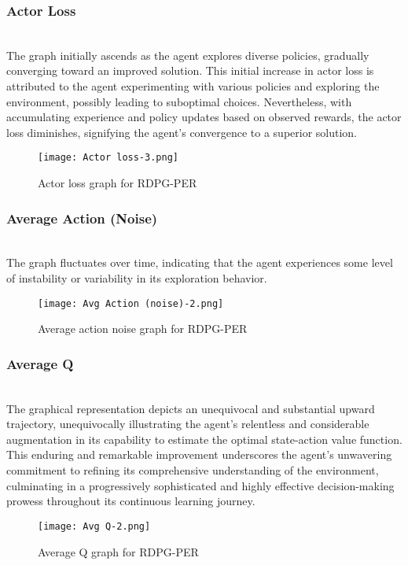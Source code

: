 \documentclass[preprint,12pt]{elsarticle}
\begin{document}
\subsubsection{Actor Loss}\\
The graph initially ascends as the agent explores diverse policies, gradually converging toward an improved solution. This initial increase in actor loss is attributed to the agent experimenting with various policies and exploring the environment, possibly leading to suboptimal choices. Nevertheless, with accumulating experience and policy updates based on observed rewards, the actor loss diminishes, signifying the agent's convergence to a superior solution.\\

\graphicspath{ {./images/} }
\begin{figure}[!htbp]
  \centering
  \texttt{[image: Actor loss-3.png]}
  \caption{Actor loss graph for RDPG-PER}  
  \label{fig:actor_loss}
\end{figure}

\subsubsection{Average Action (Noise)}\\
The graph fluctuates over time, indicating that the agent experiences some level of instability or variability in its exploration behavior.
\graphicspath{ {./images/} }
\begin{figure}[!htbp]
  \centering
  \texttt{[image: Avg Action (noise)-2.png]}
  \caption{Average action noise graph for RDPG-PER}  
  \label{fig:avg_action_noise}
\end{figure}


\subsubsection{Average Q}\\
The graphical representation depicts an unequivocal and substantial upward trajectory, unequivocally illustrating the agent's relentless and considerable augmentation in its capability to estimate the optimal state-action value function. This enduring and remarkable improvement underscores the agent's unwavering commitment to refining its comprehensive understanding of the environment, culminating in a progressively sophisticated and highly effective decision-making prowess throughout its continuous learning journey.\\
\graphicspath{ {./images/} }
\begin{figure}[!htbp]
  \centering
  \texttt{[image: Avg Q-2.png]}
  \caption{Average Q graph for RDPG-PER}  
  \label{fig:avg_q}
\end{figure}
\end{document}
